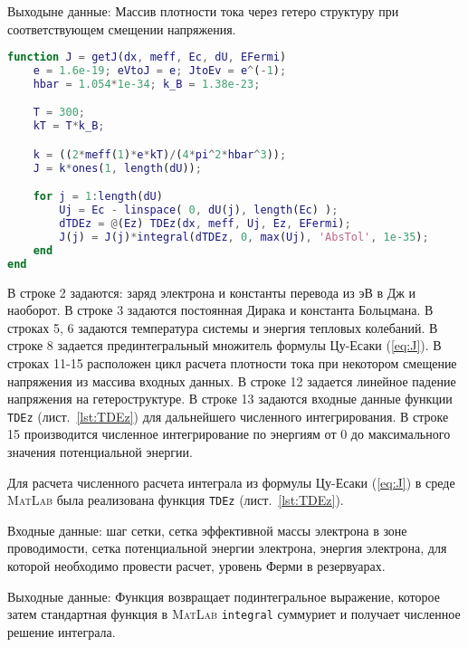 Выходыне данные: Массив плотности тока через гетеро структуру при соответствующем смещении напряжения.

\begin{lstlisting}[style=realcode,language=Matlab,caption={Расчет плотности тока по формуле Цу-Есаки},label={lst:J}]
function J = getJ(dx, meff, Ec, dU, EFermi)
	e = 1.6e-19; eVtoJ = e; JtoEv = e^(-1); 
	hbar = 1.054*1e-34; k_B = 1.38e-23;

	T = 300;
	kT = T*k_B;

	k = ((2*meff(1)*e*kT)/(4*pi^2*hbar^3));
	J = k*ones(1, length(dU));

	for j = 1:length(dU)
		Uj = Ec - linspace( 0, dU(j), length(Ec) );
		dTDEz = @(Ez) TDEz(dx, meff, Uj, Ez, EFermi);
		J(j) = J(j)*integral(dTDEz, 0, max(Uj), 'AbsTol', 1e-35);
	end
end
\end{lstlisting}
В строке 2 задаются: заряд электрона и константы перевода из эВ в Дж и наоборот. В строке 3 задаются постоянная Дирака и константа Больцмана. В строках 5, 6 задаются температура системы и энергия тепловых колебаний. В строке 8 задается прединтегральный множитель формулы Цу-Есаки (\ref{eq:J}). В строках 11-15 расположен цикл расчета плотности тока при некотором смещение напряжения из массива входных данных. В строке 12 задается линейное падение напряжения на гетероструктуре. В строке 13 задаются входные данные функции \texttt{TDEz} (лист.~\ref{lst:TDEz}) для дальнейшего численного интегрирования. В строке 15 производится численное интегрирование по энергиям от 0 до максимального значения потенциальной энергии.

Для расчета численного расчета интеграла из формулы Цу-Есаки (\ref{eq:J}) в среде \textsc{MatLab} была реализована функция \texttt{TDEz} (лист.~\ref{lst:TDEz}).

Входные данные: шаг сетки, сетка эффективной массы электрона в зоне проводимости, сетка потенциальной энергии электрона, энергия электрона, для которой необходимо провести расчет, уровень Ферми в резервуарах.

Выходные данные: Функция возвращает подинтегральное выражение, которое затем стандартная функция в \textsc{MatLab} \texttt{integral} суммуриет и получает численное решение интеграла.

